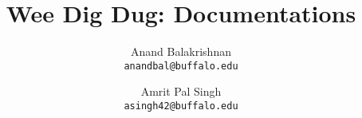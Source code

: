 

\rfoot{\thepage}

\author{
  Anand Balakrishnan \\ \texttt{anandbal@buffalo.edu}
  \and
  Amrit Pal Singh \\ \texttt{asingh42@buffalo.edu}
}
\title{Wee Dig Dug: Documentations}




  \maketitle
  \tableofcontents\newpage

  
  
  


